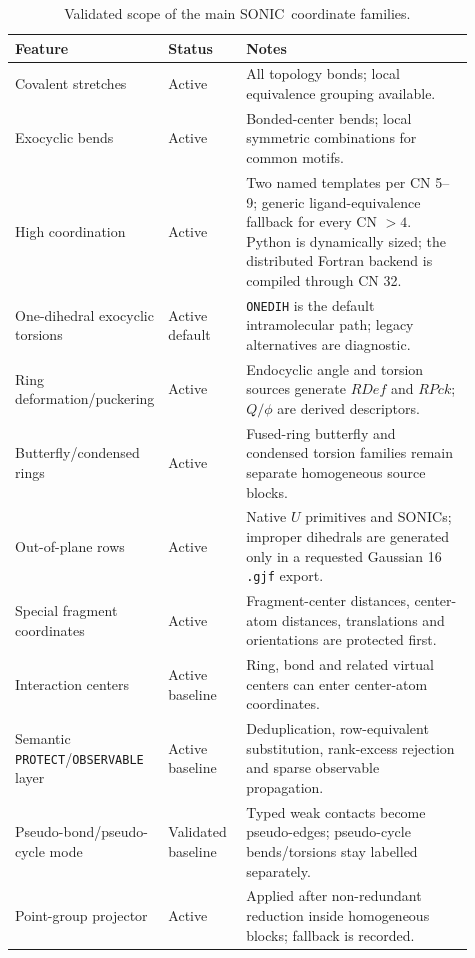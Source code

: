 \documentclass[journal=jctcce,manuscript=article,layout=traditional]{achemso}
\newcommand{\SONIC}{SONIC}
\theoremstyle{definition}
\begin{document}
\begin{table}[p]
\centering
\scriptsize
\setlength{\tabcolsep}{2.6pt}
\renewcommand{\arraystretch}{0.88}
\caption{Validated scope of the main \SONIC\ coordinate families.}
\label{tab:status}
\begin{tabular}{@{}p{0.24\linewidth}p{0.17\linewidth}p{0.50\linewidth}@{}}
\toprule
Feature & Status & Notes \\
\midrule
Covalent stretches & Active & All topology bonds; local equivalence grouping available. \\
\midrule
Exocyclic bends & Active & Bonded-center bends; local symmetric combinations for common motifs. \\
\midrule
High coordination & Active & Two named templates per CN 5--9; generic ligand-equivalence fallback for every CN $>4$. Python is dynamically sized; the distributed Fortran backend is compiled through CN 32. \\
\midrule
One-dihedral exocyclic torsions & Active default & \texttt{ONEDIH} is the default intramolecular path; legacy alternatives are diagnostic. \\
\midrule
Ring deformation/puckering & Active & Endocyclic angle and torsion sources generate \(RDef\) and \(RPck\); \(Q/\phi\) are derived descriptors. \\
\midrule
Butterfly/condensed rings & Active & Fused-ring butterfly and condensed torsion families remain separate homogeneous source blocks. \\
\midrule
Out-of-plane rows & Active & Native \(U\) primitives and SONICs; improper dihedrals are generated only in a requested Gaussian 16 \texttt{.gjf} export. \\
\midrule
Special fragment coordinates & Active & Fragment-center distances, center-atom distances, translations and orientations are protected first. \\
\midrule
Interaction centers & Active baseline & Ring, bond and related virtual centers can enter center-atom coordinates. \\
\midrule
Semantic \texttt{PROTECT}/\texttt{OBSERVABLE} layer & Active baseline & Deduplication, row-equivalent substitution, rank-excess rejection and sparse observable propagation. \\
\midrule
Pseudo-bond/pseudo-cycle mode & Validated baseline & Typed weak contacts become pseudo-edges; pseudo-cycle bends/torsions stay labelled separately. \\
\midrule
Point-group projector & Active & Applied after non-redundant reduction inside homogeneous blocks; fallback is recorded. \\

\end{tabular}
\end{table}
\end{document}
